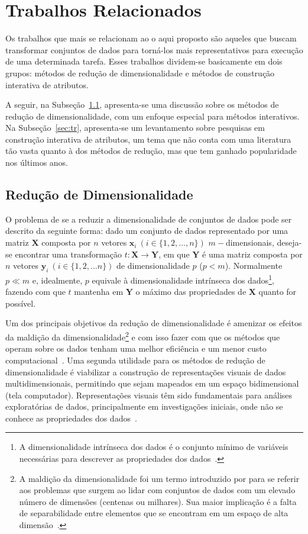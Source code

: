 \section{Trabalhos Relacionados}\label{sec:related}

Os trabalhos que mais se relacionam ao o aqui proposto são
aqueles que buscam transformar conjuntos de dados para
torná-los mais representativos para execução de uma
determinada tarefa.  Esses trabalhos dividem-se basicamente
em dois grupos: métodos de redução de dimensionalidade e
métodos de construção interativa de atributos. 

A seguir, na Subseção~\ref{sec:rd}, apresenta-se uma
discussão sobre os métodos de redução de dimensionalidade,
com um enfoque especial para métodos interativos. Na
Subseção~\ref{sec:tr}, apresenta-se um levantamento sobre
pesquisas em construção interativa de atributos, um tema que
não conta com uma literatura tão vasta quanto à dos métodos
de redução, mas que tem ganhado popularidade nos últimos
anos. 

\subsection{Redução de Dimensionalidade}\label{sec:rd}

O problema de se a reduzir a dimensionalidade de conjuntos
de dados pode ser descrito da seguinte forma: dado um
conjunto de dados representado por uma matriz $\textbf{X}$
composta por $n$ vetores $\textbf{x}_i~(i \in
\{1,2,...,n\})$ $m-$dimensionais, deseja-se encontrar uma
transformação $t: \textbf{X} \rightarrow \textbf{Y}$, em que
$\textbf{Y}$ é uma matriz composta por $n$ vetores
$\textbf{y}_i~(i \in \{1,2,...n\})$ de dimensionalidade $p$
($p < m$).  Normalmente $p \ll m$ e, idealmente, $p$
equivale à dimensionalidade intrínseca dos dados\footnote{A
dimensionalidade intrínseca dos dados é o conjunto
mínimo de variáveis necessárias para descrever as
propriedades dos dados~\cite{Fukunaga1990}.}, fazendo
com que $t$ mantenha em $\textbf{Y}$ o máximo das
propriedades de $\textbf{X}$ quanto for possível. 

Um dos principais objetivos da redução de dimensionalidade é
amenizar os efeitos da maldição da
dimensionalidade\footnote{A maldição da dimensionalidade foi
    um termo introduzido por \citet{Bellman1961} para se
    referir aos problemas que surgem ao lidar com conjuntos
    de dados com um elevado número de dimensões (centenas ou
    milhares). Sua maior implicação é a falta de
separabilidade entre elementos que se encontram em um espaço
de alta dimensão~\cite{Kouiroukidis2011}.} e com isso fazer
com que os métodos que operam sobre os dados tenham uma
melhor eficiência e um menor custo
computacional~\cite{Maaten2009}.  
Uma segunda utilidade para os métodos de redução de
dimensionalidade é viabilizar a construção de representações
visuais de dados multidimensionais, permitindo que sejam
mapeados em um espaço bidimensional (tela computador).
Representações visuais têm sido fundamentais para análises
exploratórias de dados, principalmente em investigações
iniciais, onde não
se conhece as propriedades dos dados~\cite{Kaski2011}. 

